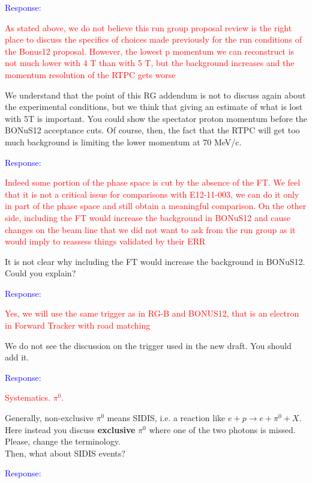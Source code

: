 \begin{itemize}
  \textcolor{blue}{Response: }
  
       
 \textcolor{red}{
 \item As stated above, we do not believe this run group proposal review is the 
    right place to discuss the specifics of choices made previously for the run 
       conditions of the Bonus12 proposal. However, the lowest p momentum we 
       can reconstruct is not much lower with 4 T than with 5 T, but the 
       background increases and the momentum resolution of the RTPC gets worse}
\newline

We understand that the point of this RG addendum is not to discuss again about 
       the experimental conditions, but we think that giving an estimate of 
       what is lost with 5T is important. You could show the spectator proton 
       momentum before the BONuS12 acceptance cuts. Of course, then, the fact 
       that the RTPC will get too much background is limiting the lower 
       momentum at 70 MeV/c.

  
       \textcolor{blue}{Response: }

\textcolor{red}{
\item Indeed some portion
of the phase space is cut by the absence of the FT. We feel that it is not a critical issue
for comparisons with E12-11-003, we can do it only in part of the phase space and still
obtain a meaningful comparison. On the other side, including the FT would increase
the background in BONuS12 and cause changes on the beam line that we did not want
to ask from the run group as it would imply to reassess things validated by their ERR
}
 \newline

It is not clear why including the FT would increase the background in BONuS12.  
Could you explain?
  
  \textcolor{blue}{Response: }
 



\textcolor{red}{
 \item Yes, we will use the same trigger as in RG-B and BONUS12, that is an 
    electron in Forward Tracker with road matching  }
 \newline
We do not see the discussion on the trigger used in the new draft. You should 
add it.


  \textcolor{blue}{Response: }


  \textcolor{red}{
  \item Systematics. $\pi^0$.  }
  \newline
 
 Generally, non-exclusive $\pi^0$ means SIDIS, i.e. a reaction like 
 $e+p\rightarrow e+\pi^0+X$. Here instead you discuss \textbf{exclusive} 
 $\pi^0$ where one of the two photons is missed. Please, change the 
 terminology. \\ Then, what about SIDIS events?
  
  
  \textcolor{blue}{Response: }
  
 \end{itemize}
